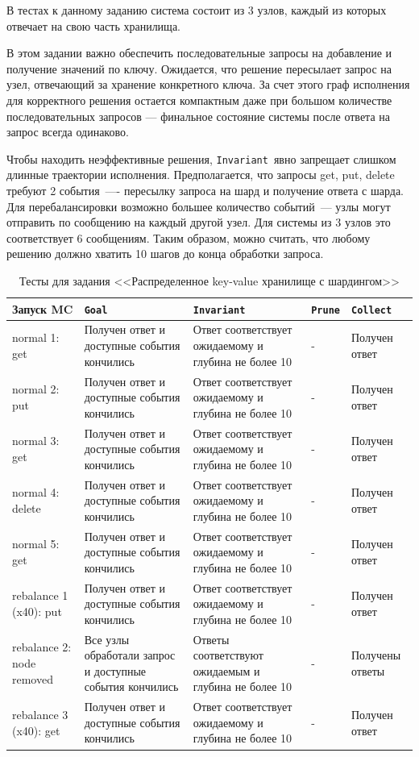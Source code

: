 \documentclass[a4paper,12pt]{extarticle}
\newcommand{\goal}[0]{\texttt{Goal}}
\newcommand{\prune}[0]{\texttt{Prune}}
\newcommand{\invariant}[0]{\texttt{Invariant}}
\newcommand{\collect}[0]{\texttt{Collect}}
\newcommand{\mc}[0]{MC}
\begin{document}
В тестах к данному заданию система состоит из 3 узлов, каждый из которых отвечает на свою часть хранилища.

В этом задании важно обеспечить последовательные запросы на добавление и получение значений по ключу.
Ожидается, что решение пересылает запрос на узел, отвечающий за хранение конкретного ключа.
За счет этого граф исполнения для корректного решения остается компактным даже при большом количестве последовательных запросов --- финальное состояние системы после ответа на запрос всегда одинаково.

Чтобы находить неэффективные решения, \invariant\ явно запрещает слишком длинные траектории исполнения.
Предполагается, что запросы get, put, delete требуют 2 события~---- пересылку запроса на шард и получение ответа с шарда.
Для перебалансировки возможно большее количество событий~--- узлы могут отправить по сообщению на каждый другой узел.
Для системы из 3 узлов это соответствует 6 сообщениям.
Таким образом, можно считать, что любому решению должно хватить 10 шагов до конца обработки запроса.


\begin{table}[htbp]
    \caption{Тесты для задания <<Распределенное key-value хранилище с шардингом>>}
    \begin{center}
    \begin{tabular}{|p{}|p{}|p{}|p{}|p{} |}
    \hline
    Запуск \mc & \goal & \invariant & \prune & \collect \\
    \hline
    normal 1: get & Получен ответ и доступные события кончились & Ответ соответствует ожидаемому и глубина не более 10 & - & Получен ответ \\
    normal 2: put & Получен ответ и доступные события кончились & Ответ соответствует ожидаемому и глубина не более 10 & - & Получен ответ \\
    normal 3: get & Получен ответ и доступные события кончились & Ответ соответствует ожидаемому и глубина не более 10 & - & Получен ответ \\
    normal 4: delete & Получен ответ и доступные события кончились & Ответ соответствует ожидаемому и глубина не более 10 & - & Получен ответ \\
    normal 5: get & Получен ответ и доступные события кончились & Ответ соответствует ожидаемому и глубина не более 10 & - & Получен ответ \\
    \hline
    rebalance 1 (x40): put & Получен ответ и доступные события кончились & Ответ соответствует ожидаемому и глубина не более 10 & - & Получен ответ \\
    rebalance 2: node removed & Все узлы обработали запрос и доступные события кончились & Ответы соответствуют ожидаемым и глубина не более 10 & - & Получены ответы \\
    rebalance 3 (x40): get & Получен ответ и доступные события кончились & Ответ соответствует ожидаемому и глубина не более 10 & - & Получен ответ \\
    \hline
    \end{tabular}
    \label{testskvsharding}
    \end{center}
\end{table}
\end{document}
